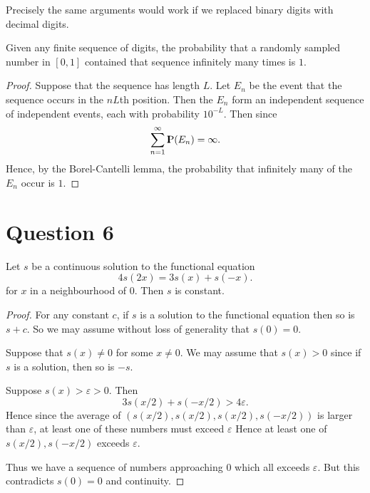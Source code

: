 \documentclass{unswmaths}
\begin{document}
\begin{remark}
    Precisely the same arguments would work if we replaced
    binary digits with decimal digits.
\end{remark}

\begin{theorem}
    Given any finite sequence of digits, the probability that a
    randomly sampled number in $[0,1]$
    contained that sequence infinitely many times is $1$.
\end{theorem}
\begin{proof}
    Suppose that the sequence has length $L$. Let $E_n$
    be the event that the sequence occurs in
    the $nL$th position. Then the $E_n$ form an independent sequence
    of independent events, each with probability $10^{-L}$. Then since
    \begin{equation*}
        \sum_{n=1}^\infty {\rm I\kern-.3em P}(E_n) = \infty.
    \end{equation*}
    Hence, by the Borel-Cantelli lemma, the probability that infinitely
    many of the $E_n$ occur is $1$.
\end{proof}

\section*{Question 6}

\begin{lemma}
\label{firstFunctional}
    Let $s$ be a continuous solution to the functional equation
    \begin{equation*}
        4s(2x) = 3s(x)+s(-x).
    \end{equation*}
    for $x$ in a neighbourhood of $0$.
    Then $s$ is constant.
\end{lemma}
\begin{proof}
    For any constant $c$, if $s$ is a solution to the functional
    equation then so is $s+c$. So we may assume without loss
    of generality that $s(0) = 0$.
    
    Suppose that $s(x) \neq 0$ for some $x \neq 0$. We may assume that $s(x) > 0$
    since if $s$ is a solution, then so is $-s$.
    
    Suppose $s(x) > \varepsilon > 0$. Then 
    \begin{equation*}
        3s(x/2)+s(-x/2) > 4\varepsilon. 
    \end{equation*}
    Hence since the average of $(s(x/2),s(x/2),s(x/2),s(-x/2))$
    is larger than $\varepsilon$, at least one of these numbers
    must exceed $\varepsilon$
    Hence at least one of $s(x/2),s(-x/2)$ exceeds $\varepsilon$. 
    
    Thus we have a sequence of numbers approaching $0$ which all
    exceeds $\varepsilon$. But this contradicts $s(0) = 0$
    and continuity.
\end{proof}
\end{document}

